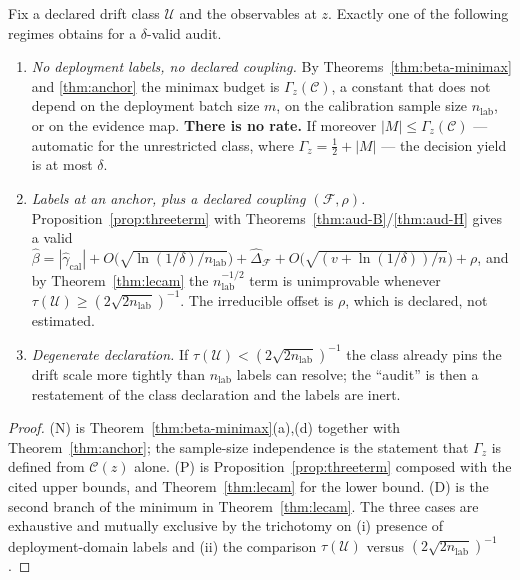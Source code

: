 \begin{theorem}[Dichotomy]\label{thm:dichotomy}
Fix a declared drift class $\mathcal U$ and the observables at $z$. Exactly one of the
following regimes obtains for a $\delta$-valid audit.
\begin{enumerate}
\item[\textnormal{(N)}]\emph{No deployment labels, no declared coupling.} By
Theorems~\ref{thm:beta-minimax} and \ref{thm:anchor} the minimax budget is
$\Gamma_z(\mathcal C)$, a constant that does not depend on the deployment batch size $m$, on
the calibration sample size $n_{\mathrm{lab}}$, or on the evidence map. \textbf{There is no
rate.} If moreover $|M|\le\Gamma_z(\mathcal C)$ --- automatic for the unrestricted class,
where $\Gamma_z=\tfrac12+|M|$ --- the decision yield is at most $\delta$.
\item[\textnormal{(P)}]\emph{Labels at an anchor, plus a declared coupling
$(\mathcal F,\rho)$.} Proposition~\ref{prop:threeterm} with
Theorems~\ref{thm:aud-B}/\ref{thm:aud-H} gives a valid
$\widehat\beta=|\widehat\gamma_{\mathrm{cal}}|
+O\bigl(\sqrt{\ln(1/\delta)/n_{\mathrm{lab}}}\bigr)
+\widehat\Delta_{\mathcal F}+O\bigl(\sqrt{(v+\ln(1/\delta))/n}\bigr)+\rho$,
and by Theorem~\ref{thm:lecam} the $n_{\mathrm{lab}}^{-1/2}$ term is unimprovable whenever
$\tau(\mathcal U)\ge(2\sqrt{2n_{\mathrm{lab}}})^{-1}$. The irreducible offset is $\rho$,
which is declared, not estimated.
\item[\textnormal{(D)}]\emph{Degenerate declaration.} If $\tau(\mathcal U)<(2\sqrt{2n_{\mathrm{lab}}})^{-1}$
the class already pins the drift scale more tightly than $n_{\mathrm{lab}}$ labels can
resolve; the ``audit'' is then a restatement of the class declaration and the labels are
inert.
\end{enumerate}
\end{theorem}
\begin{proof}
(N) is Theorem~\ref{thm:beta-minimax}(a),(d) together with Theorem~\ref{thm:anchor}; the
sample-size independence is the statement that $\Gamma_z$ is defined from $\mathcal C(z)$
alone. (P) is Proposition~\ref{prop:threeterm} composed with the cited upper bounds, and
Theorem~\ref{thm:lecam} for the lower bound. (D) is the second branch of the minimum in
Theorem~\ref{thm:lecam}. The three cases are exhaustive and mutually exclusive by the
trichotomy on (i) presence of deployment-domain labels and (ii) the comparison
$\tau(\mathcal U)$ versus $(2\sqrt{2n_{\mathrm{lab}}})^{-1}$.
\end{proof}

